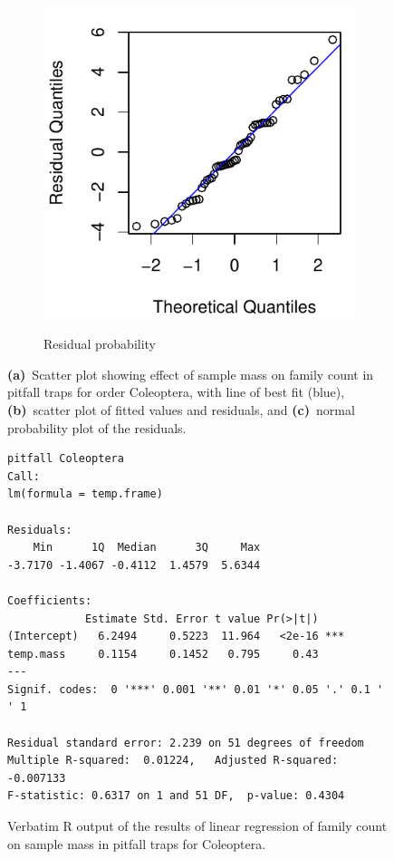 \documentclass[10pt,letterpaper,twocolumn]{article}
\begin{document}
\begin{figure}[h]
\begin{subfigure}[b]{0.15\textwidth}
		\label{fig:pitfall_coleoptera_resid}
	\end{subfigure}
	~
	\begin{subfigure}[b]{0.15\textwidth}
		\caption{Residual probability}
		\includegraphics[width=\textwidth]{plots/mass-vs-count/qqplot/2015_pitfall_Coleoptera_qqplot.pdf}
		\label{fig:pitfall_coleoptera_qqplot}
	\end{subfigure}
	\caption{\textbf{(a)}~Scatter plot showing effect of sample mass on family count in pitfall traps for order Coleoptera, with line of best fit (blue), \textbf{(b)}~scatter plot of fitted values and residuals, and \textbf{(c)}~normal probability plot of the residuals.}
	\label{fig:pitfall_coleoptera}
	\smallskip
	\nointerlineskip
	\hrulefill
\end{figure}

\begin{figure}[h]
	\lstset{numbers=left}
	\lstset{xleftmargin=5mm,framexleftmargin=5mm}
	\begin{lstlisting}
pitfall Coleoptera
Call:
lm(formula = temp.frame)

Residuals:
    Min      1Q  Median      3Q     Max 
-3.7170 -1.4067 -0.4112  1.4579  5.6344 

Coefficients:
            Estimate Std. Error t value Pr(>|t|)    
(Intercept)   6.2494     0.5223  11.964   <2e-16 ***
temp.mass     0.1154     0.1452   0.795     0.43    
---
Signif. codes:  0 '***' 0.001 '**' 0.01 '*' 0.05 '.' 0.1 ' ' 1

Residual standard error: 2.239 on 51 degrees of freedom
Multiple R-squared:  0.01224,	Adjusted R-squared:  -0.007133 
F-statistic: 0.6317 on 1 and 51 DF,  p-value: 0.4304
	\end{lstlisting}
	\caption{Verbatim R output of the results of linear regression of family count on sample mass in pitfall traps for Coleoptera.}
	\label{fig:pitfall_coleoptera_regression}
	\smallskip
	\nointerlineskip
	\hrulefill
\end{figure}
\end{document}
